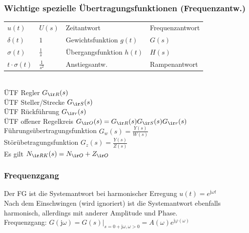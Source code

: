\documentclass[german]{latex4ei/latex4ei_sheet}
\renewcommand{\i}{\mathrm{j}}
\begin{document}
\begin{sectionbox}
	\subsubsection{Wichtige spezielle Übertragungsfunktionen (Frequenzantw.)}
	\begin{tabular}{@{}ll|ll}
		$u(t)$ & $U(s)$ & Zeitantwort & Frequenzantwort\\ \mrule
		$\delta(t)$ & $1$ & Gewichtsfunktion $g(t)$ & $G(s)$\\
		$\sigma(t)$ & $\frac{1}{s}$ & Übergangsfunktion $h(t)$ & $H(s)$\\
		$t \cdot \sigma(t)$ & $\frac{1}{s^2}$ & Anstiegsantw. & Rampenantwort\\
	\end{tabular}\\


	ÜTF Regler $G_{\ir R}(s)$\\
	ÜTF Steller/Strecke $G_{\ir S}(s)$\\
	ÜTF Rückführung $G_{\ir r}(s)$\\
	ÜTF offener Regelkreis $G_{\ir O}(s) = G_{\ir R}(s) G_{\ir S}(s) G_{\ir r}(s)$\\
	Führungsübertragungsfunktion $G_w(s) = \frac{Y(s)}{W(s)}$\\
	Störübetragungsfunktion $G_z(s) = \frac{Y(s)}{Z(s)}$\\

	Es gilt $N_{\ir RK}(s) = N_{\ir O} + Z_{\ir O}$

	\subsubsection{Frequenzgang}
	Der FG ist die Systemantwort bei harmonischer Erregung $u(t) = e^{\i \omega t}$\\
	Nach dem Einschwingen (wird ignoriert) ist die Systemantwort ebenfalls harmonisch, allerdings mit anderer Amplitude und Phase.\\
	Frequenzgang: $G(\i \omega) = G(s)|_{s = 0 + \i \omega, \omega > 0} = A(\omega) e^{\i \varphi(\omega)}$
\end{sectionbox}
\end{document}
